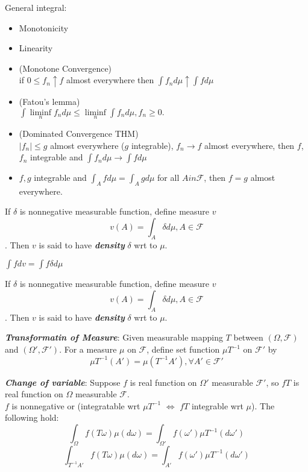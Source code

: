 \documentclass[10pt,twocolumn]{article}
\newenvironment{mydef}[1][Definition]{\begin{trivlist}
\item[\hskip \labelsep {\bfseries #1}]}{\end{trivlist}}
\newenvironment{props}[1][Properties]{\begin{trivlist}
\item[\hskip \labelsep {\bfseries #1}]}{\end{trivlist}}
\newcommand{\bt}[1]{\textbf{\textit{#1}}}
\begin{document}
\begin{props} General integral:
	\begin{itemize}
		\item Monotonicity
		\item Linearity
		\item (Monotone Convergence) \\  if $ 0 \leq f_n \uparrow f$ almost everywhere then $\int f_n d\mu \uparrow \int f d\mu$
		\item (Fatou's lemma) \\  $\int \liminf\limits_n f_n d\mu \leq \liminf\limits_n \int f_n d\mu,  f_n\ge 0.$
		\item (Dominated Convergence THM) \\ $|f_n| \leq g$ almost everywhere ($g$ integrable), $f_n \rightarrow f$ almost everywhere,  then $f$, $f_n$ integrable and $\int f_n d\mu \rightarrow \int fd\mu$
		\item $f, g$ integrable and $\int_A fd\mu = \int_A g d\mu$ for all $A in \mathscr{F}$, then $f=g$ almost everywhere.
	\end{itemize}
\end{props}

\begin{mydef}
	If $\delta$ is nonnegative measurable function, define measure $v$ $$ v(A) = \int_A \delta d\mu, A \in \mathscr{F}$$. Then $v$ is said to have \bt{density} $\delta$ wrt to $\mu$.
\end{mydef}

\begin{props}
	$\int f dv = \int f \delta d \mu$
\end{props}

\begin{mydef}
	If $\delta$ is nonnegative measurable function, define measure $v$ $$ v(A) = \int_A \delta d\mu, A \in \mathscr{F}$$. Then $v$ is said to have \bt{density} $\delta$ wrt to $\mu$.
\end{mydef}


\begin{mydef}
	\bt{Transformatin of Measure}: Given measurable mapping $T$ between $(\Omega, \mathscr{F})$ and $(\Omega', \mathscr{F}')$. For a measure $\mu$ on $\mathscr{F}$, define set function $\mu T^{-1}$ on $\mathscr{F}'$ by  $$\mu T^{-1}(A') = \mu (T^{-1}A'), \forall A' \in \mathscr{F}'$$
\end{mydef}

\begin{mydef}
	\bt{Change of variable}: Suppose $f$ is real function on $\Omega'$ measurable $\mathscr{F}'$, so $fT$ is real function on $\Omega$ measurable $\mathscr{F}$. \\
	$f$ is nonnegative or (integratable wrt $\mu T^{-1}$ $	\Leftrightarrow$  $fT$ integrable wrt $\mu$). The following hold:
	 $$\int_\Omega f(T\omega)\mu (d\omega) = \int_{\Omega'} f(\omega')\mu T^{-1}(d\omega')$$
	 $$\int_{T^{-1}A'} f(T\omega)\mu (d\omega) = \int_{A'} f(\omega')\mu T^{-1}(d\omega')$$
\end{mydef}
\end{document}
